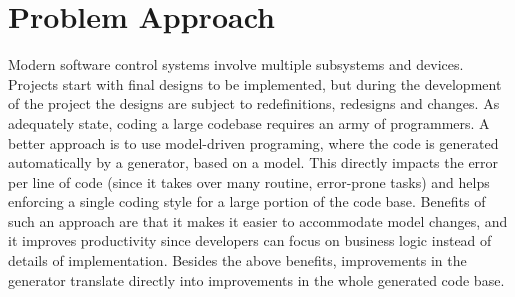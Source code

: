 \section{Problem Approach}
\label{sec:problem-approach}
Modern software control systems
involve multiple subsystems
and devices.
Projects start with final designs to be implemented,
but during the development of the project
the designs are subject to redefinitions,
redesigns and changes.
As~\cite{farris07:_device_driver_code_gener_framew,%
         farris06:_generating_software_modules}
adequately state,
coding a large codebase requires an
army of programmers.
A better approach is to use model-driven programing,
where the code is generated automatically
by a generator, based on a model.
This directly impacts the error per line of code
(since it takes over many routine, error-prone tasks)
and helps enforcing a single coding style for
a large portion of the code base.
Benefits of such an approach are that
it makes it easier to accommodate model changes,
and
it improves productivity since developers
can focus on business logic
instead of details of implementation.
Besides the above benefits,
improvements in the generator translate directly
into improvements in the whole generated code base.

